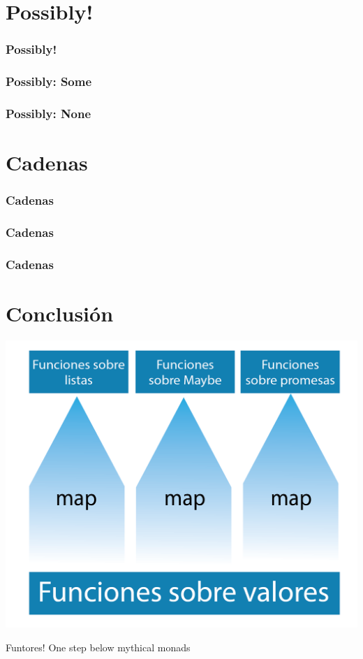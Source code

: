 \documentclass{beamer}
\begin{document}
\section{Possibly!}
\begin{frame}[fragile]
  \frametitle{Possibly!}
  
\end{frame}

\begin{frame}[fragile]
  \frametitle{Possibly: Some}
  
\end{frame}

\begin{frame}[fragile]
  \frametitle{Possibly: None}
  
\end{frame}

\section{Cadenas}
\begin{frame}[fragile]
  \frametitle{Cadenas}
  
\end{frame}

\begin{frame}[fragile]
  \frametitle{Cadenas}
  
\end{frame}

\begin{frame}[fragile]
  \frametitle{Cadenas}
  
\end{frame}

\section{Conclusión}
\begin{frame}
  \includegraphics[scale=0.7]{lifting-diagram.png}
\end{frame}

\begin{frame}
  Funtores! One step below mythical monads
\end{frame}
\end{document}
